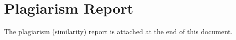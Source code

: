 \begingroup
  \renewcommand{\addcontentsline}[3]{}
  \chapter{Plagiarism Report}
\endgroup
{}
\label{app:plagiarism}

The plagiarism (similarity) report is attached at the end of this document.

